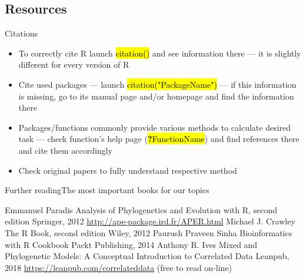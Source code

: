 \documentclass[compress, ucs, xelatex, 11pt, xcolor=svgnames,
	hyperref={
		bookmarks=true,
		unicode=true,
		colorlinks=true,
		pdftitle={Molecular data in R},
		plainpages=false,
		pdfauthor={Vojtech Zeisek},
		pdfsubject={Course about phylogeny and evolution in R},
		pdfcreator={XeLaTeX},
		pdfkeywords={R, evolution, phylogeny, molecular data},
		linkcolor=Tomato,
		anchorcolor=SaddleBrown,
		citecolor=Goldenrod,
		filecolor=DarkMagenta,
		menucolor=Sienna,
		urlcolor=DarkTurquoise,
		pdftex},
	url={hyphens, lowtilde} %
	]{beamer}
\renewcommand{\texttt}[1]{\hl{\ttfamily #1}}
\begin{document}
\subsection{Resources}

\begin{frame}{Citations}
	\begin{itemize}
		\item To correctly cite R launch \texttt{citation()} and see information there --- it is slightly different for every version of R
		\item Cite used packages --- launch \texttt{citation("PackageName")} --- if this information is missing, go to its manual page and/or homepage and find the information there
		\item Packages/functions commonly provide various methods to calculate desired task --- check function's help page (\texttt{\textbf{?}FunctionName}) and find references there and cite them accordingly
		\item Check original papers to fully understand respective method
	\end{itemize}
\end{frame}

\begin{frame}{Further reading}{The most important books for our topics}
	\begin{multicols}{2}
		\begin{thebibliography}{1}
				Emmanuel Paradis
				\newblock Analysis of Phylogenetics and Evolution with R, second edition
				\newblock Springer, 2012
				\newblock \url{http://ape-package.ird.fr/APER.html}
				Michael J. Crawley
				\newblock The R Book, second edition
				\newblock Wiley, 2012
				Paurush Praveen Sinha
				\newblock Bioinformatics with R Cookbook
				\newblock Packt Publishing, 2014
				Anthony R. Ives
				\newblock Mixed and Phylogenetic Models: A Conceptual Introduction to Correlated Data
				\newblock Leanpub, 2018
				\newblock \url{https://leanpub.com/correlateddata} (free to read on-line)
		\end{thebibliography}
	\end{multicols}
\end{frame}
\end{document}
